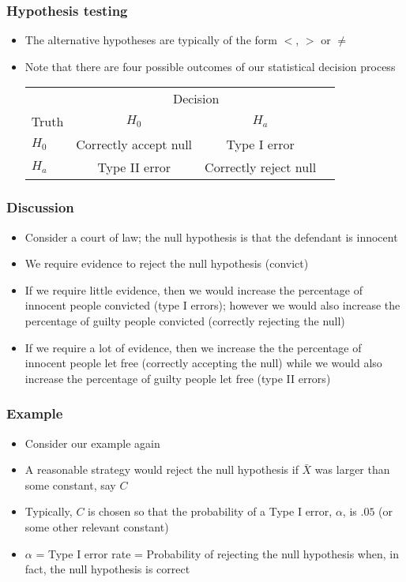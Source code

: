 \documentclass{beamer}
\begin{document}
\begin{frame}\frametitle{Hypothesis testing}
\begin{itemize}
\item The alternative hypotheses are typically of the form $<$, $>$ or $\neq$
\item Note that there are four possible outcomes of our statistical decision
  process
\begin{center}
  \begin{tabular}{lccc}
      & \multicolumn{2}{c}{Decision} \\
Truth & $H_0$ & $H_a$ \\ \hline
$H_0$ & Correctly accept null & Type I error \\
$H_a$ & Type II error & Correctly reject null  \\ \hline
  \end{tabular}
\end{center}
\end{itemize}
\end{frame}

\begin{frame}\frametitle{Discussion}
\begin{itemize}
\item Consider a court of law; the null hypothesis is that the
  defendant is innocent
\item We require evidence to reject the null hypothesis (convict)
\item If we require little evidence, then we would increase the
  percentage of innocent people convicted (type I errors); however we
  would also increase the percentage of guilty people convicted
  (correctly rejecting the null)
\item If we require a lot of evidence, then we increase the the
  percentage of innocent people let free (correctly accepting the
  null) while we would also increase the percentage of guilty people
  let free (type II errors)
\end{itemize}
\end{frame}

\begin{frame}\frametitle{Example}
\begin{itemize}
\item Consider our example again
\item A reasonable strategy would reject the null hypothesis if
  $\bar X$ was larger than some constant, say $C$
\item Typically, $C$ is chosen so that the probability of a Type I
  error, $\alpha$, is $.05$ (or some other relevant constant)
\item $\alpha$ = Type I error rate = Probability of rejecting the null hypothesis
  when, in fact, the null hypothesis is correct
\end{itemize}
\end{frame}
\end{document}
